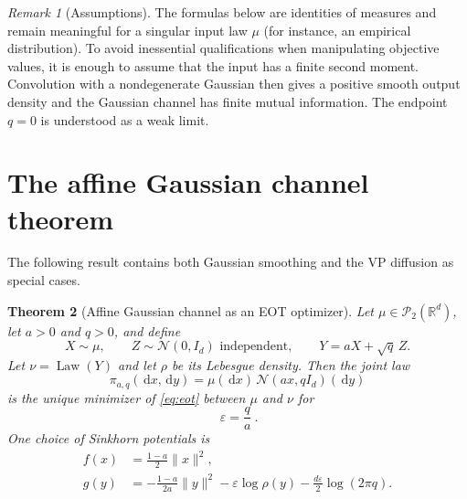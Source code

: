 \documentclass[11pt]{article}
\newtheorem{theorem}{Theorem}[section]
\theoremstyle{remark}
\newtheorem{remark}[theorem]{Remark}
\newcommand{\R}{\mathbb{R}}
\newcommand{\N}{\mathcal{N}}
\newcommand{\Law}{\operatorname{Law}}
\newcommand{\dd}{\,\mathrm{d}}
\begin{document}
\begin{remark}[Assumptions]
The formulas below are identities of measures and remain meaningful for a
singular input law $\mu$ (for instance, an empirical distribution).  To avoid
inessential qualifications when manipulating objective values, it is enough
to assume that the input has a finite second moment.  Convolution with a
nondegenerate Gaussian then gives a positive smooth output density and the
Gaussian channel has finite mutual information.  The endpoint $q=0$ is
understood as a weak limit.
\end{remark}

\section{The affine Gaussian channel theorem}

The following result contains both Gaussian smoothing and the VP diffusion
as special cases.

\begin{theorem}[Affine Gaussian channel as an EOT optimizer]
  \label{thm:affine}
Let $\mu\in\mathcal P_2(\R^d)$, let $a>0$ and $q>0$, and define
\begin{equation}
  \label{eq:affine-channel}
  X\sim\mu,\qquad Z\sim\N(0,I_d)\text{ independent},\qquad
  Y=aX+\sqrt q\,Z.
\end{equation}
Let $\nu=\Law(Y)$ and let $\rho$ be its Lebesgue density.  Then the joint law
\begin{equation}
  \label{eq:affine-coupling}
  \pi_{a,q}(\dd x,\dd y)
  =\mu(\dd x)\,\N(ax,qI_d)(\dd y)
\end{equation}
is the unique minimizer of \eqref{eq:eot} between $\mu$ and $\nu$ for
\begin{equation}
  \label{eq:epsilon-aq}
  \boxed{\ \varepsilon=\frac qa\ }.
\end{equation}
One choice of Sinkhorn potentials is
\begin{align}
  \label{eq:f-affine}
  f(x)&=\frac{1-a}{2}\lVert x\rVert^2,\\
  \label{eq:g-affine}
  g(y)&=-\frac{1-a}{2a}\lVert y\rVert^2
        -\varepsilon\log\rho(y)
        -\frac{d\varepsilon}{2}\log(2\pi q).
\end{align}
\end{theorem}
\end{document}
